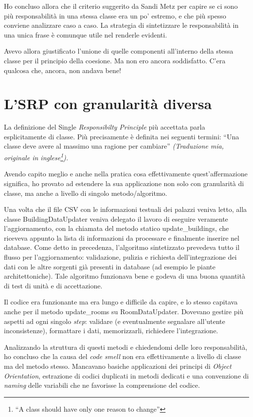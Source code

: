 \documentclass[12pt]{report}
\begin{document}
Ho concluso allora che il criterio suggerito da Sandi Metz 
per capire se ci sono più responsabilità in una stessa classe era
un po' estremo, e che più spesso conviene analizzare caso a caso. La
strategia di sintetizzare le responsabilità in una unica frase
è comunque utile nel renderle evidenti.

Avevo allora giustificato l'unione di quelle componenti all'interno della
stessa classe per il principio della coesione.
Ma non ero ancora soddisfatto. C'era qualcosa che, ancora, non andava bene!

\section{L'SRP con granularità diversa}

La definizione del Single \textit{Responsibilty Principle} più accettata
parla esplicitamente di classe. Più precisamente è definita nei seguenti 
termini: ``Una classe deve avere al massimo una ragione per cambiare''\cite{bobmartin2003}
\textit{
(Traduzione mia, originale in inglese\footnote{
  ``A class should have only one reason to change''
}).
}

Avendo capito meglio e anche nella pratica cosa effettivamente 
quest'affermazione significa, ho provato ad estendere la sua applicazione
non solo con granularità di classe, ma anche a livello di singolo 
metodo/algoritmo.

Una volta che il file CSV con le informazioni testuali dei palazzi
veniva letto, alla classe BuildingDataUpdater 
veniva delegato il lavoro di eseguire veramente l'aggiornamento, con 
la chiamata del metodo statico update\_buildings, che riceveva appunto la 
lista di informazioni da processare e finalmente inserire nel database. 
Come detto in precedenza, l'algoritmo sintetizzato prevedeva tutto il 
flusso per l'aggiornamento: validazione, pulizia e richiesta dell'integrazione
dei dati con le altre sorgenti già presenti in database (ad esempio le piante 
architettoniche). Tale algoritmo funzionava bene e godeva di una buona quantità
di test di unità e di accettazione. 

Il codice era funzionante ma era lungo e difficile da capire, e lo stesso
capitava anche per il metodo update\_rooms su RoomDataUpdater.
Dovevano gestire più aspetti ad ogni singolo \textit{step}:
validare (e eventualmente segnalare all'utente inconsistenze), formattare i
dati, memorizzarli, richiedere l'integrazione.

Analizzando la struttura di questi metodi e chiedendomi delle loro
responsabilità, ho concluso che la causa del \textit{code smell} non
era effettivamente a livello di classe ma del metodo stesso. 
Mancavano basiche applicazioni dei principi di \textit{Object Orientation},
estrazione di codici duplicati in metodi dedicati e una convenzione
di \textit{naming} delle variabili che ne favorisse la comprensione
del codice.
\end{document}
